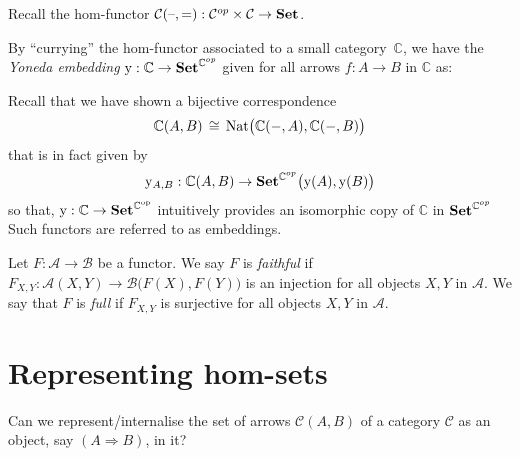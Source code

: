 \begin{remark}
Recall the hom-functor 
$\mathcal{C}(\text{--},\text{=}): \mathcal{C}^{op} \times \mathcal{C} \rightarrow
\mathbf {Set}$.
\end{remark}

\begin{definition}
By ``currying'' the hom-functor associated to a small category~$\mathbb C$, we
have the \emph{Yoneda embedding} 
$\mathrm{y}: \mathbb{C} \rightarrow \mathbf {Set}^{\mathbb{C}^{op}}$ given for all arrows
$f: A \rightarrow B$ in $\mathbb{C}$ as:
\begin{center}
\end{center}

Recall that we have shown a bijective correspondence
\[ 
  \mathbb{C}(A,B) 
  \,\cong\,
  \text{Nat}\big( \mathbb{C}(-,A), \mathbb{C}(-,B)\big) 
\]
that is in fact given by
\[
  \mathrm{y}_{A,B} 
  : \mathbb{C}(A,B) \to \mathbf {Set}^{\mathbb{C}^{op}}\big(\mathrm{y}(A),\mathrm{y}(B)\big)
\]
so that, $\mathrm{y}: \mathbb C\to\mathbf {Set}^{\mathbb C^{\mathrm{op}}}$ intuitively provides an
isomorphic copy of $\mathbb C$ in $\mathbf {Set}^{\mathbb{C}^{op}}$ Such functors
are referred to as embeddings.
\end{definition}

\begin{definition}
Let $F : \mathcal{A} \rightarrow \mathcal{B}$ be a functor. We say $F$ is 
\emph{faithful} if 
$F_{X,Y} : \mathcal{A}(X,Y) \rightarrow \mathcal{B}\big(F(X),F(Y)\big)$ is an
injection for all objects $X,Y$ in $\mathcal{A}$.  We say that $F$ is
\emph{full} if $F_{X,Y}$ is surjective for all objects $X,Y$ in $\mathcal{A}$.
\end{definition}

\section{Representing hom-sets}

Can we represent/internalise the set of arrows $\mathcal{C}(A,B)$ of a
category $\mathcal C$ as an object, say $(A \Rightarrow B)$, in it?

